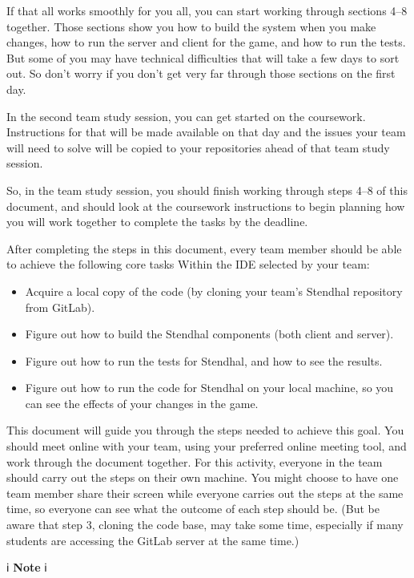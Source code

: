 \documentclass[
]{book}
\providecommand{\tightlist}{%
  \setlength{\itemsep}{0pt}\setlength{\parskip}{0pt}}
\begin{document}
If that all works smoothly for you all, you can start working through sections 4--8 together. Those sections show you how to build the system when you make changes, how to run the server and client for the game, and how to run the tests. But some of you may have technical difficulties that will take a few days to sort out. So don't worry if you don't get very far through those sections on the first day.

In the second team study session, you can get started on the coursework. Instructions for that will be made available on that day and the issues your team will need to solve will be copied to your repositories ahead of that team study session.

So, in the team study session, you should finish working through steps 4--8 of this document, and should look at the coursework instructions to begin planning how you will work together to complete the tasks by the deadline.

After completing the steps in this document, every team member should be able to achieve the following core tasks Within the IDE selected by your team:

\begin{itemize}
\tightlist
\item
  Acquire a local copy of the code (by cloning your team's Stendhal repository from GitLab).
\item
  Figure out how to build the Stendhal components (both client and server).
\item
  Figure out how to run the tests for Stendhal, and how to see the results.
\item
  Figure out how to run the code for Stendhal on your local machine, so you can see the effects of your changes in the game.
\end{itemize}

This document will guide you through the steps needed to achieve this goal. You should meet online with your team, using your preferred online meeting tool, and work through the document together. For this activity, everyone in the team should carry out the steps on their own machine. You might choose to have one team member share their screen while everyone carries out the steps at the same time, so everyone can see what the outcome of each step should be. (But be aware that step 3, cloning the code base, may take some time, especially if many students are accessing the GitLab server at the same time.)

ℹ️ \textbf{Note} ℹ️
\end{document}
